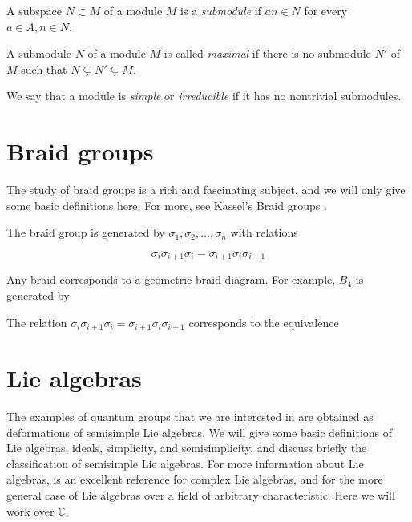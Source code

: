 \begin{defn}
    A subspace $N \subset M$ of a module $M$ is a \emph{submodule} if $an \in
    N$ for every $a \in A, n\in N$.
\end{defn}

\begin{defn}
    A submodule $N$ of a module $M$ is called \emph{maximal} if there is no
    submodule $N'$ of $M$ such that $N \subsetneq N' \subsetneq M$.
\end{defn}

\begin{defn}
    We say that a module is \emph{simple} or \emph{irreducible} if it has no
    nontrivial submodules.
\end{defn}

\section{Braid groups}

The study of braid groups is a rich and fascinating subject, and we will only give some basic definitions here. For more, see Kassel's Braid groups \cite{KasselBraid}.

The braid group is generated by $\sigma_1, \sigma_2, \ldots, \sigma_n$ with relations

\begin{equation}
    \sigma_i \sigma_{i+1} \sigma_i = \sigma_{i+1} \sigma_i \sigma_{i+1}
\end{equation}

Any braid corresponds to a geometric braid diagram. For example, $B_4$ is generated by 


The relation $\sigma_i \sigma_{i+1} \sigma_i = \sigma_{i+1} \sigma_i \sigma_{i+1}$ corresponds to the equivalence



\section{Lie algebras}

The examples of quantum groups that we are interested in are obtained as
deformations of semisimple Lie algebras. We will give some basic definitions of
Lie algebras, ideals, simplicity, and semisimplicity, and discuss briefly the
classification of semisimple Lie algebras.  For more information about Lie
algebras, \cite{Hall2003} is an excellent reference for complex Lie algebras,
and \cite{Humphreys1973} for the more general case of Lie algebras over a
field of arbitrary characteristic. Here we will work over $\mathbb{C}$.


